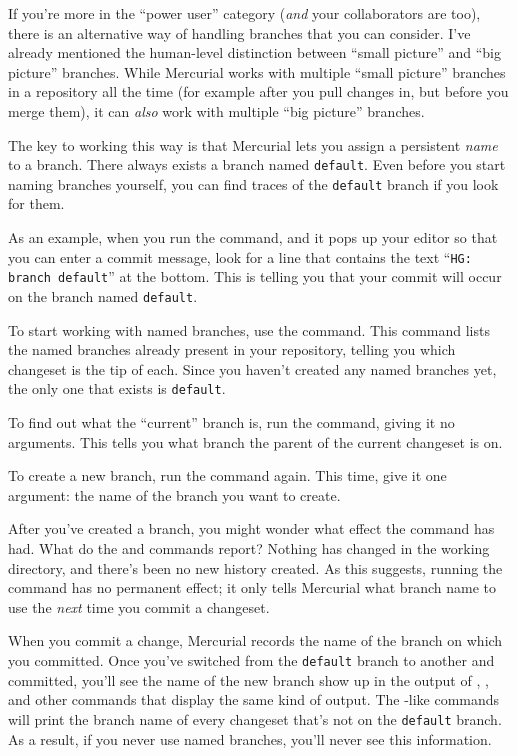 If you're more in the ``power user'' category (\emph{and} your
collaborators are too), there is an alternative way of handling
branches that you can consider.  I've already mentioned the
human-level distinction between ``small picture'' and ``big picture''
branches.  While Mercurial works with multiple ``small picture''
branches in a repository all the time (for example after you pull
changes in, but before you merge them), it can \emph{also} work with
multiple ``big picture'' branches.

The key to working this way is that Mercurial lets you assign a
persistent \emph{name} to a branch.  There always exists a branch
named \texttt{default}.  Even before you start naming branches
yourself, you can find traces of the \texttt{default} branch if you
look for them.

As an example, when you run the  command, and it pops up
your editor so that you can enter a commit message, look for a line
that contains the text ``\texttt{HG: branch default}'' at the bottom.
This is telling you that your commit will occur on the branch named
\texttt{default}.

To start working with named branches, use the 
command.  This command lists the named branches already present in
your repository, telling you which changeset is the tip of each.
Since you haven't created any named branches yet, the only one that
exists is \texttt{default}.

To find out what the ``current'' branch is, run the 
command, giving it no arguments.  This tells you what branch the
parent of the current changeset is on.

To create a new branch, run the  command again.  This
time, give it one argument: the name of the branch you want to create.

After you've created a branch, you might wonder what effect the
 command has had.  What do the  and
 commands report?
Nothing has changed in the working directory, and there's been no new
history created.  As this suggests, running the  command
has no permanent effect; it only tells Mercurial what branch name to
use the \emph{next} time you commit a changeset.

When you commit a change, Mercurial records the name of the branch on
which you committed.  Once you've switched from the \texttt{default}
branch to another and committed, you'll see the name of the new branch
show up in the output of , , and other commands
that display the same kind of output.
The -like commands will print the branch name of every
changeset that's not on the \texttt{default} branch.  As a result, if
you never use named branches, you'll never see this information.

